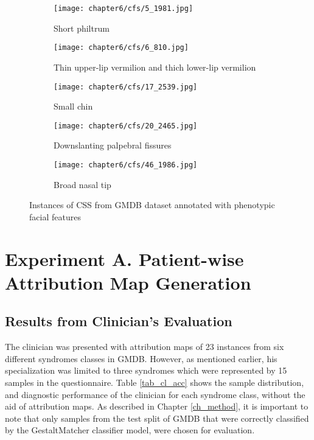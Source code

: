 \documentclass[../report.tex]{subfiles}
\begin{document}
	 \begin{figure}[H]\label{fig_cfs}
	 	\centering
	 	\begin{subfigure}[t]{0.17\textwidth}
	 		\centering
	 		\texttt{[image: chapter6/cfs/5\_1981.jpg]}
	 		\caption{Short philtrum}
	 	\end{subfigure}
	 	\begin{subfigure}[t]{0.17\textwidth}
	 		\centering
	 		\texttt{[image: chapter6/cfs/6\_810.jpg]}
	 		\caption{Thin upper-lip vermilion and thich lower-lip vermilion }
	 	\end{subfigure}	
	 	\begin{subfigure}[t]{0.17\textwidth}
	 		\centering
	 		\texttt{[image: chapter6/cfs/17\_2539.jpg]}
	 		\caption{Small chin}
	 	\end{subfigure}	
	 	\begin{subfigure}[t]{0.17\textwidth}
	 		\centering
	 		\texttt{[image: chapter6/cfs/20\_2465.jpg]}
	 		\caption{Downslanting palpebral fissures}
	 	\end{subfigure}	
	 	\begin{subfigure}[t]{0.17\textwidth}
	 		\centering
	 		\texttt{[image: chapter6/cfs/46\_1986.jpg]}
	 		\caption{Broad nasal tip}
	 	\end{subfigure}	
	 	\caption[Instances of HPMRS from GMDB dataset]{Instances of CSS from GMDB dataset annotated with phenotypic facial features}
	 \end{figure}
	 
	 
    \section{Experiment A. Patient-wise Attribution Map Generation}
    
    
    
    \subsection{Results from Clinician's Evaluation}
    The clinician was presented with attribution maps of 23 instances from six different syndromes classes in GMDB. However, as mentioned earlier, his specialization was limited to three syndromes which were represented by 15 samples in the questionnaire. Table \ref{tab_cl_acc} shows the sample distribution, and diagnostic performance of the clinician for each syndrome class, without the aid of attribution maps. As described in  Chapter \ref{ch_method}, it is important to note that only samples from the test split of GMDB that were correctly classified by the GestaltMatcher classifier model, were chosen for evaluation. 
    
\end{document}
